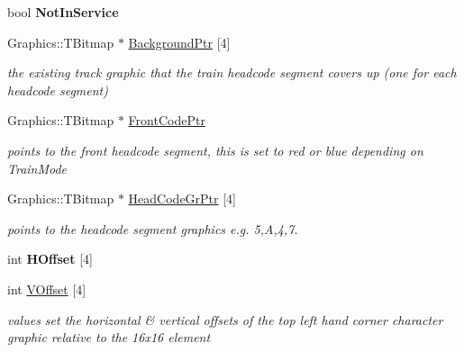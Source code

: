 \begin{DoxyCompactItemize}
\item 
\mbox{\label{class_t_train_a92fca7c6fa30d8a5d5847b74e51e62cc}} 
bool {\bfseries Not\+In\+Service}
\item 
\mbox{\label{class_t_train_aaa4e520024a9e4c86e8754bb3c7cac2c}} 
Graphics\+::\+T\+Bitmap $\ast$ \mbox{\hyperlink{class_t_train_aaa4e520024a9e4c86e8754bb3c7cac2c}{Background\+Ptr}} \mbox{[}4\mbox{]}
\begin{DoxyCompactList}\small\item\em the existing track graphic that the train headcode segment covers up (one for each headcode segment) \end{DoxyCompactList}\item 
\mbox{\label{class_t_train_a4ee3cdc7a3602f92a96084f8818b9bd3}} 
Graphics\+::\+T\+Bitmap $\ast$ \mbox{\hyperlink{class_t_train_a4ee3cdc7a3602f92a96084f8818b9bd3}{Front\+Code\+Ptr}}
\begin{DoxyCompactList}\small\item\em points to the front headcode segment, this is set to red or blue depending on Train\+Mode \end{DoxyCompactList}\item 
\mbox{\label{class_t_train_ac19e1d8b5171bace341f951bac1031e1}} 
Graphics\+::\+T\+Bitmap $\ast$ \mbox{\hyperlink{class_t_train_ac19e1d8b5171bace341f951bac1031e1}{Head\+Code\+Gr\+Ptr}} \mbox{[}4\mbox{]}
\begin{DoxyCompactList}\small\item\em points to the headcode segment graphics e.\+g. 5,A,4,7. \end{DoxyCompactList}\item 
\mbox{\label{class_t_train_a5b5409585a4af5224f1d91be6a405503}} 
int {\bfseries H\+Offset} \mbox{[}4\mbox{]}
\item 
int \mbox{\hyperlink{class_t_train_a4c8b153a620229a3d9cc54f64ffa5f4a}{V\+Offset}} \mbox{[}4\mbox{]}
\begin{DoxyCompactList}\small\item\em values set the horizontal \& vertical offsets of the top left hand corner character graphic relative to the 16x16 element \end{DoxyCompactList}\item 

\end{DoxyCompactItemize}
